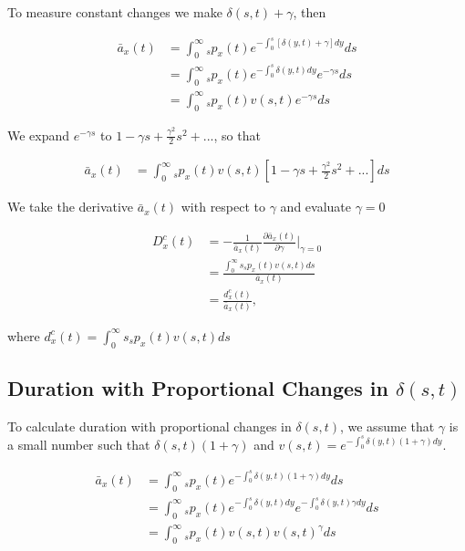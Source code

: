 \documentclass[12pt]{article}
\begin{document}
To measure constant changes we make $\delta(s,t)+\gamma$, then

\begin{equation}\label{eq:DurationConst1}
\begin{split}
\bar{a}_{x}(t) &= \int_0^\infty {}_sp_x(t) e^{- \int_{0}^{s} [\delta(y,t)+\gamma]dy}ds \\
&= \int_0^\infty {}_sp_x(t) e^{- \int_{0}^{s}\delta(y,t)dy}e^{-\gamma s}ds \\
&= \int_0^\infty {}_sp_x(t) {v}(s,t)e^{-\gamma s}ds
\end{split}
\end{equation}

We expand $e^{-\gamma s}$ to $1-\gamma s+\frac{\gamma^2}{2} s^{2} +...$, so that


\begin{equation}\label{eq:DurationConst1}
\begin{split}
\bar{a}_{x}(t) &= \int_0^\infty {}_sp_x(t) {v}(s,t)[1-\gamma s+\frac{\gamma^2}{2} s^{2} +...]ds
\end{split}
\end{equation}

We take the derivative $\bar{a}_{x}(t)$ with respect to $\gamma$ and evaluate $\gamma=0$


\begin{equation}\label{eq:DurationConst2}
\begin{split}
{D}^{c}_x(t)&=-\frac{1}{\bar{a}_x(t)}\frac{\partial \bar{a}_x(t)}{\partial \gamma} \bigg\rvert_{\gamma=0}\\
              &= \frac{\int_0^\infty s {}_sp_x(t) {v}(s,t)ds}{\bar{a}_x(t)} \\
              &= \frac{{d}^{c}_x(t)}{\bar{a}_x(t)},
\end{split}
\end{equation}

where ${d}^{c}_x(t)=\int_0^\infty s {}_sp_x(t) {v}(s,t)ds$



\subsection{Duration with Proportional Changes in $\delta(s,t)$} \label{sec:DurProp}

To calculate duration with proportional changes in $\delta(s,t)$, we assume that $\gamma$ is a small number such that $\delta(s,t)(1+\gamma)$ and  ${v}(s,t)=e^{-\int_0^{s}  \delta(y,t)(1+\gamma)dy}$.


\begin{equation}\label{eq:DurationProp1}
\begin{split}
\bar{a} _x(t) &= \int_0^\infty {}_sp_x(t) e^{-\int_0^{s}\delta(y,t)(1+\gamma)dy}ds \\
&= \int_0^\infty {}_sp_x(t) e^{-\int_0^{s}\delta(y,t)dy}e^{-\int_0^{s}\delta(y,t)\gamma dy}ds \\
&= \int_0^\infty {}_sp_x(t) v(s,t)v(s,t)^{\gamma}ds \\
\end{split}
\end{equation}
\end{document}
